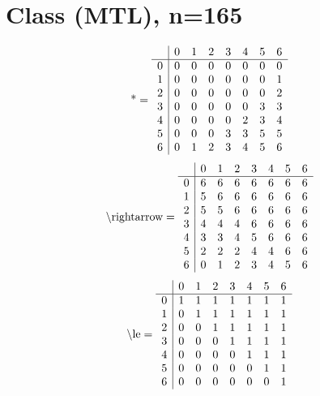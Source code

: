 \documentclass[11pt]{article}
\begin{document}
\section{Class (MTL), n=165}
\[\text{*} = 
\begin{array}{r | r r r r r r r}
 & 0 & 1 & 2 & 3 & 4 & 5 & 6 \\ \hline
0 & 0 & 0 & 0 & 0 & 0 & 0 & 0 \\
1 & 0 & 0 & 0 & 0 & 0 & 0 & 1 \\
2 & 0 & 0 & 0 & 0 & 0 & 0 & 2 \\
3 & 0 & 0 & 0 & 0 & 0 & 3 & 3 \\
4 & 0 & 0 & 0 & 0 & 2 & 3 & 4 \\
5 & 0 & 0 & 0 & 3 & 3 & 5 & 5 \\
6 & 0 & 1 & 2 & 3 & 4 & 5 & 6 \\
\end{array}
\]
\[\text{\textbackslash rightarrow} = 
\begin{array}{r | r r r r r r r}
 & 0 & 1 & 2 & 3 & 4 & 5 & 6 \\ \hline
0 & 6 & 6 & 6 & 6 & 6 & 6 & 6 \\
1 & 5 & 6 & 6 & 6 & 6 & 6 & 6 \\
2 & 5 & 5 & 6 & 6 & 6 & 6 & 6 \\
3 & 4 & 4 & 4 & 6 & 6 & 6 & 6 \\
4 & 3 & 3 & 4 & 5 & 6 & 6 & 6 \\
5 & 2 & 2 & 2 & 4 & 4 & 6 & 6 \\
6 & 0 & 1 & 2 & 3 & 4 & 5 & 6 \\
\end{array}
\]
\[\text{\textbackslash le} = 
\begin{array}{r | r r r r r r r}
 & 0 & 1 & 2 & 3 & 4 & 5 & 6 \\ \hline
0 & 1 & 1 & 1 & 1 & 1 & 1 & 1 \\
1 & 0 & 1 & 1 & 1 & 1 & 1 & 1 \\
2 & 0 & 0 & 1 & 1 & 1 & 1 & 1 \\
3 & 0 & 0 & 0 & 1 & 1 & 1 & 1 \\
4 & 0 & 0 & 0 & 0 & 1 & 1 & 1 \\
5 & 0 & 0 & 0 & 0 & 0 & 1 & 1 \\
6 & 0 & 0 & 0 & 0 & 0 & 0 & 1 \\
\end{array}
\]
\end{document}
